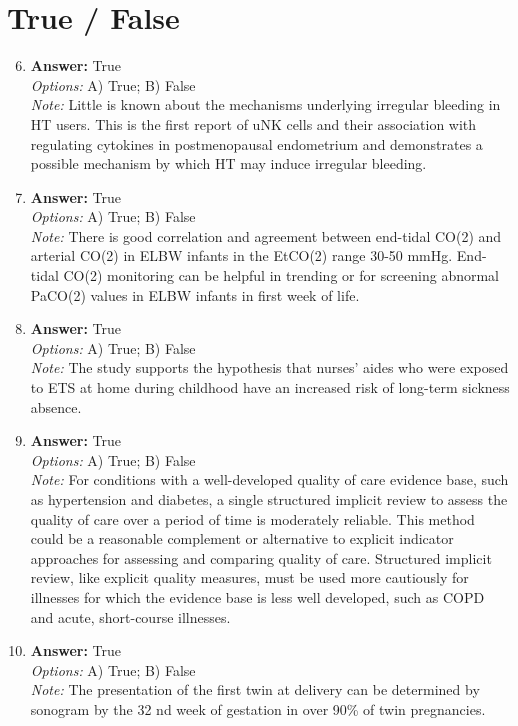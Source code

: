 \documentclass[12pt]{article}
\begin{document}
\section*{True / False}
\begin{enumerate}[label=\arabic*.]
\setcounter{enumi}{5}
\item \textbf{Answer:} True
\\ \textit{Options:} A) True; B) False
\\ \textit{Note:} Little is known about the mechanisms underlying irregular bleeding in HT users. This is the first report of uNK cells and their association with regulating cytokines in postmenopausal endometrium and demonstrates a possible mechanism by which HT may induce irregular bleeding.
\item \textbf{Answer:} True
\\ \textit{Options:} A) True; B) False
\\ \textit{Note:} There is good correlation and agreement between end-tidal CO(2) and arterial CO(2) in ELBW infants in the EtCO(2) range 30-50 mmHg. End-tidal CO(2) monitoring can be helpful in trending or for screening abnormal PaCO(2) values in ELBW infants in first week of life.
\item \textbf{Answer:} True
\\ \textit{Options:} A) True; B) False
\\ \textit{Note:} The study supports the hypothesis that nurses' aides who were exposed to ETS at home during childhood have an increased risk of long-term sickness absence.
\item \textbf{Answer:} True
\\ \textit{Options:} A) True; B) False
\\ \textit{Note:} For conditions with a well-developed quality of care evidence base, such as hypertension and diabetes, a single structured implicit review to assess the quality of care over a period of time is moderately reliable. This method could be a reasonable complement or alternative to explicit indicator approaches for assessing and comparing quality of care. Structured implicit review, like explicit quality measures, must be used more cautiously for illnesses for which the evidence base is less well developed, such as COPD and acute, short-course illnesses.
\item \textbf{Answer:} True
\\ \textit{Options:} A) True; B) False
\\ \textit{Note:} The presentation of the first twin at delivery can be determined by sonogram by the 32 nd week of gestation in over 90\% of twin pregnancies.
\end{enumerate}
\end{document}
